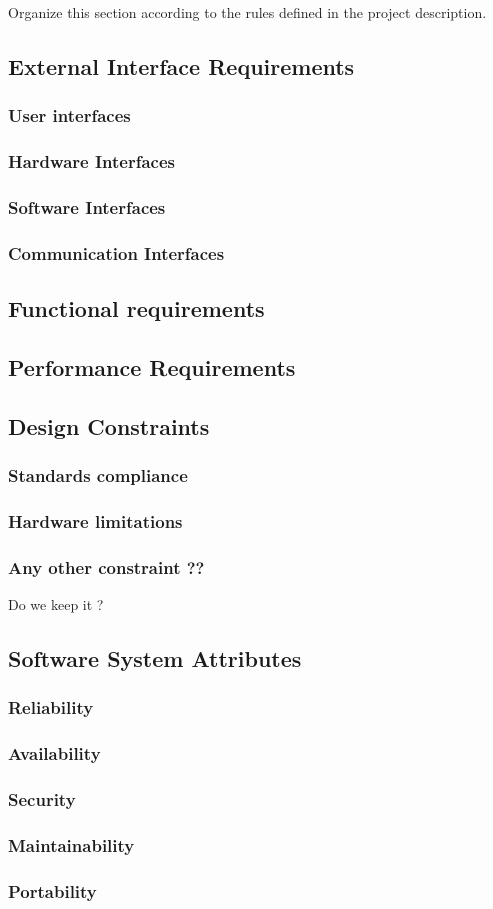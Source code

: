 Organize this section according to the rules defined in the project description. 

\subsection{External Interface Requirements}
\subsubsection{User interfaces}
\subsubsection{Hardware Interfaces}
\subsubsection{Software Interfaces}
\subsubsection{Communication Interfaces}
\subsection{Functional requirements}

\subsection{Performance Requirements}

\subsection{Design Constraints}
\subsubsection{Standards compliance}
\subsubsection{Hardware limitations}
\subsubsection{Any other constraint ??}
Do we keep it ?
\subsection{Software System Attributes}
\subsubsection{Reliability}
\subsubsection{Availability}
\subsubsection{Security}
\subsubsection{Maintainability}
\subsubsection{Portability}
